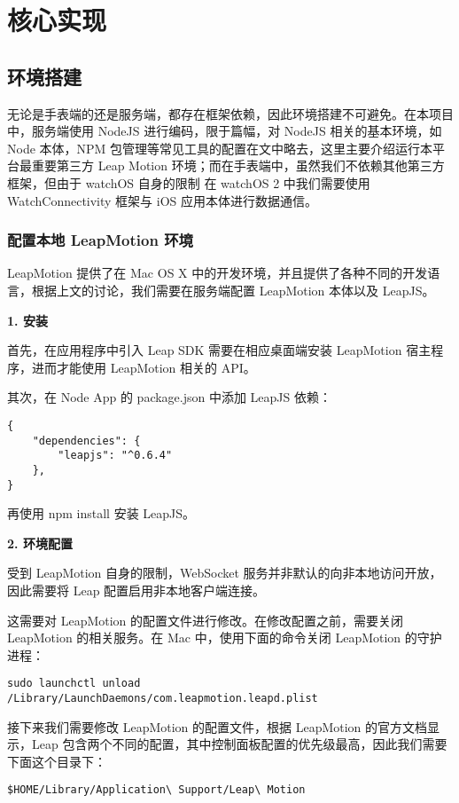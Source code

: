\chapter{核心实现}

\section{环境搭建}

无论是手表端的还是服务端，都存在框架依赖，因此环境搭建不可避免。在本项目中，服务端使用 NodeJS 进行编码，限于篇幅，对 NodeJS 相关的基本环境，如 Node 本体，NPM 包管理等常见工具的配置在文中略去，这里主要介绍运行本平台最重要第三方 Leap Motion 环境；而在手表端中，虽然我们不依赖其他第三方框架，但由于 watchOS 自身的限制\cite{WatchConnectivity:2016} 在 watchOS 2 中我们需要使用 WatchConnectivity 框架与 iOS 应用本体进行数据通信。

\subsection{配置本地 LeapMotion 环境}

LeapMotion 提供了在 Mac OS X 中的开发环境，并且提供了各种不同的开发语言，根据上文的讨论，我们需要在服务端配置 LeapMotion 本体以及 LeapJS。

\textbf{1. 安装}

首先，在应用程序中引入 Leap SDK 需要在相应桌面端安装 LeapMotion 宿主程序，进而才能使用 LeapMotion 相关的 API。

其次，在 Node App 的 package.json 中添加 LeapJS 依赖：
\begin{lstlisting}
{
    "dependencies": {
        "leapjs": "^0.6.4"
    },
}
\end{lstlisting}
再使用 npm install 安装 LeapJS。

\textbf{2. 环境配置}

受到 LeapMotion 自身的限制\cite{Leap:2016}，WebSocket 服务并非默认的向非本地访问开放，因此需要将 Leap 配置启用非本地客户端连接。

这需要对 LeapMotion 的配置文件进行修改。在修改配置之前，需要关闭 LeapMotion 的相关服务。在 Mac 中，使用下面的命令关闭 LeapMotion 的守护进程：
\begin{lstlisting}
sudo launchctl unload /Library/LaunchDaemons/com.leapmotion.leapd.plist
\end{lstlisting}

接下来我们需要修改 LeapMotion 的配置文件，根据 LeapMotion 的官方文档显示，Leap 包含两个不同的配置，其中控制面板配置的优先级最高，因此我们需要下面这个目录下：
\begin{lstlisting}
$HOME/Library/Application\ Support/Leap\ Motion
\end{lstlisting}


